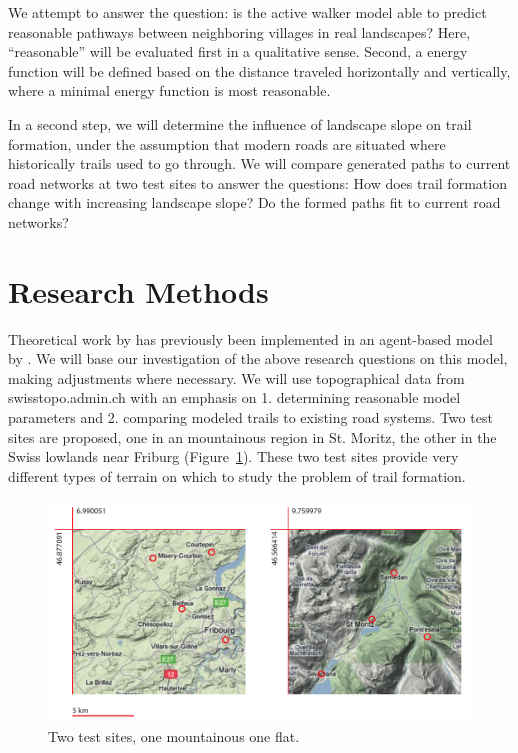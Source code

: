 \documentclass[a4paper, DIV11, abstracton]{scrartcl}
\begin{document}
We attempt to answer the question: is the active walker model able to predict reasonable pathways between neighboring villages in real landscapes? Here, ``reasonable'' will be evaluated first in a qualitative sense. Second, a energy function will be defined based on the distance traveled horizontally and vertically, where a minimal energy function is most reasonable.

In a second step, we will determine the influence of landscape slope on trail formation, under the assumption that modern roads are situated where historically trails used to go through. We will compare generated paths to current road networks at two test sites to answer the questions: How does trail formation change with increasing landscape slope? Do the formed paths fit to current road networks?


\section{Research Methods}


Theoretical work by \citet{helbing:1997} has previously been implemented in an agent-based model by \citet{trailsystems}. We will base our investigation of the above research questions on this model, making adjustments where necessary. We will use topographical data from swisstopo.admin.ch with an emphasis on 1. determining reasonable model parameters and 2. comparing modeled trails to existing road systems. Two test sites are proposed, one in an mountainous region in St. Moritz, the other in the Swiss lowlands near Friburg (Figure~\ref{fig:site}). These two test sites provide very different types of terrain on which to study the problem of trail formation.

\begin{figure}[tbp]
	\includegraphics[width=\linewidth]{../figures/site}
	\caption{Two test sites, one mountainous one flat.}
	\label{fig:site}
\end{figure}
\end{document}
